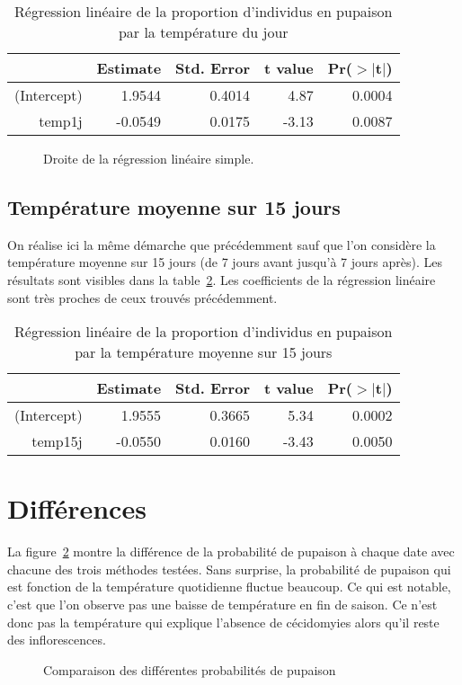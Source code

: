 \documentclass[a4paper, 11pt]{article}
\begin{document}
\begin{table}[ht]
\centering
\caption{Régression linéaire de la proportion d'individus en pupaison par la température du jour}
\label{tab:lm}
\begin{tabular}{rrrrr}
 & Estimate & Std. Error & t value & Pr($>$$|$t$|$) \\ 
  \hline
(Intercept) & 1.9544 & 0.4014 & 4.87 & 0.0004 \\ 
 temp1j & -0.0549 & 0.0175 & -3.13 & 0.0087 
\end{tabular}
\end{table}
 
\begin{figure}[ht]
\centering
{}
 \caption{Droite de la régression linéaire simple.}
 \label{fig:lm}
\end{figure}

\subsection{Température moyenne sur 15 jours}

On réalise ici la même démarche que précédemment sauf que l'on considère la température moyenne sur 15 jours (de 7 jours avant jusqu'à 7 jours après). Les résultats sont visibles dans la table~\ref{tab:lm2}.
Les coefficients de la régression linéaire sont très proches de ceux trouvés précédemment.

\begin{table}[hb]
\centering
\caption{Régression linéaire de la proportion d'individus en pupaison par la température moyenne sur 15 jours}
\label{tab:lm2}
\begin{tabular}{rrrrr}
 & Estimate & Std. Error & t value & Pr($>$$|$t$|$) \\ 
  \hline
(Intercept) & 1.9555 & 0.3665 & 5.34 & 0.0002 \\ 
  temp15j & -0.0550 & 0.0160 & -3.43 & 0.0050 \\ 
\end{tabular}
\end{table}

\section{Différences}

La figure~\ref{fig:compup} montre la différence de la probabilité de pupaison à chaque date avec chacune des trois méthodes testées. Sans surprise, la probabilité de pupaison qui est fonction de la température quotidienne fluctue beaucoup. Ce qui est notable, c'est que l'on observe pas une baisse de température en fin de saison. Ce n'est donc pas la température qui explique l'absence de cécidomyies alors qu'il reste des inflorescences.
\begin{figure}[ht]
\centering
{}
 \caption{Comparaison des différentes probabilités de pupaison}
 \label{fig:compup}
\end{figure}
\end{document}
